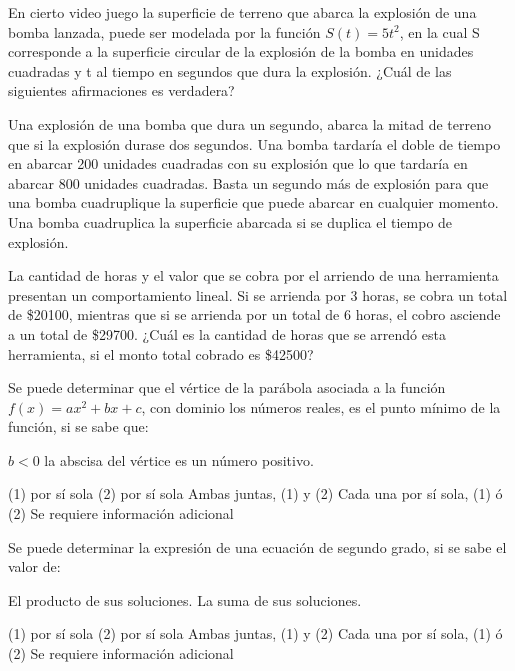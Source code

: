 \documentclass[
  titulo=Tarea,
  subtitulo=Álgebra y funciones,
  curso=Tercero medio,
  con nombre,
]{srs3}
\begin{document}
\begin{preguntas}
\pregunta En cierto video juego la superficie de terreno que abarca la explosión de una bomba lanzada, puede ser modelada por la función \(S\left(t\right) = 5t^2\), en la cual S corresponde a la superficie circular de la explosión de la bomba en unidades cuadradas y t al tiempo en segundos que dura la explosión. ¿Cuál de las siguientes afirmaciones es verdadera?
\begin{alternativas}
\alternativa Una explosión de una bomba que dura un segundo, abarca la mitad de terreno que si la explosión durase dos segundos.
\alternativa Una bomba tardaría el doble de tiempo en abarcar 200 unidades cuadradas con su explosión que lo que tardaría en abarcar 800 unidades cuadradas.
\alternativa Basta un segundo más de explosión para que una bomba cuadruplique la superficie que puede abarcar en cualquier momento.
\alternativa Una bomba cuadruplica la superficie abarcada si se duplica el tiempo de explosión.
\end{alternativas}

\pregunta La cantidad de horas y el valor que se cobra por el arriendo de una herramienta presentan un comportamiento lineal. Si se arrienda por 3 horas, se cobra un total de \$20100, mientras que si se arrienda por un total de 6 horas, el cobro asciende a un total de \$29700. ¿Cuál es la cantidad de horas que se arrendó esta herramienta, si el monto total cobrado es \$42500?
\begin{alternativas}
\end{alternativas}

\pregunta Se puede determinar que el vértice de la parábola asociada a la función \(f\left(x\right) = ax^2 + bx + c\), con dominio los números reales, es el punto mínimo de la función, si se sabe que:
\begin{opciones*}
\opcion \(b<0\)
\opcion la abscisa del vértice es un número positivo.
\end{opciones*}
\begin{alternativas}
\alternativa (1) por sí sola
\alternativa (2) por sí sola
\alternativa Ambas juntas, (1) y (2)
\alternativa Cada una por sí sola, (1) ó (2)
\alternativa Se requiere información adicional
\end{alternativas}

\pregunta Se puede determinar la expresión de una ecuación de segundo grado, si se sabe el valor de:
\begin{opciones*}
\opcion El producto de sus soluciones.
\opcion La suma de sus soluciones.
\end{opciones*}
\begin{alternativas}
\alternativa (1) por sí sola
\alternativa (2) por sí sola
\alternativa Ambas juntas, (1) y (2)
\alternativa Cada una por sí sola, (1) ó (2)
\alternativa Se requiere información adicional
\end{alternativas}


\end{preguntas}
\end{document}
